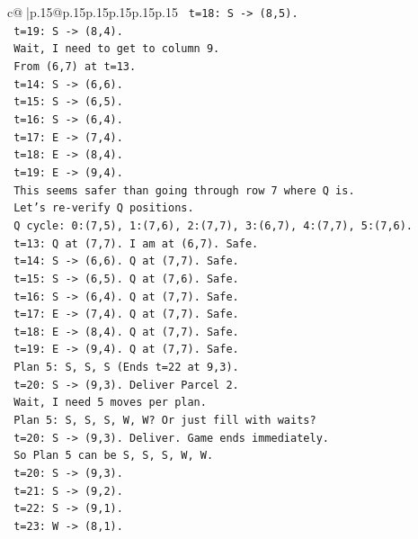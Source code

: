 \documentclass{article}
\begin{document}
{\begin{supertabular}{c@{$\;$}|p{.15\linewidth}@{}p{.15\linewidth}p{.15\linewidth}p{.15\linewidth}p{.15\linewidth}p{.15\linewidth}}
{{{\texttt{     t=18: S {-}> (8,5).} \\
\texttt{     t=19: S {-}> (8,4).} \\
\texttt{     Wait, I need to get to column 9.} \\
\texttt{     From (6,7) at t=13.} \\
\texttt{     t=14: S {-}> (6,6).} \\
\texttt{     t=15: S {-}> (6,5).} \\
\texttt{     t=16: S {-}> (6,4).} \\
\texttt{     t=17: E {-}> (7,4).} \\
\texttt{     t=18: E {-}> (8,4).} \\
\texttt{     t=19: E {-}> (9,4).} \\
\texttt{     This seems safer than going through row 7 where Q is.} \\
\texttt{     Let's re{-}verify Q positions.} \\
\texttt{     Q cycle: 0:(7,5), 1:(7,6), 2:(7,7), 3:(6,7), 4:(7,7), 5:(7,6).} \\
\texttt{     t=13: Q at (7,7). I am at (6,7). Safe.} \\
\texttt{     t=14: S {-}> (6,6). Q at (7,7). Safe.} \\
\texttt{     t=15: S {-}> (6,5). Q at (7,6). Safe.} \\
\texttt{     t=16: S {-}> (6,4). Q at (7,7). Safe.} \\
\texttt{     t=17: E {-}> (7,4). Q at (7,7). Safe.} \\
\texttt{     t=18: E {-}> (8,4). Q at (7,7). Safe.} \\
\texttt{     t=19: E {-}> (9,4). Q at (7,7). Safe.} \\
\texttt{   Plan 5: S, S, S (Ends t=22 at 9,3).} \\
\texttt{     t=20: S {-}> (9,3). Deliver Parcel 2.} \\
\texttt{     Wait, I need 5 moves per plan.} \\
\texttt{     Plan 5: S, S, S, W, W? Or just fill with waits?} \\
\texttt{     t=20: S {-}> (9,3). Deliver. Game ends immediately.} \\
\texttt{     So Plan 5 can be S, S, S, W, W.} \\
\texttt{     t=20: S {-}> (9,3).} \\
\texttt{     t=21: S {-}> (9,2).} \\
\texttt{     t=22: S {-}> (9,1).} \\
\texttt{     t=23: W {-}> (8,1).} \\
}}}
\end{supertabular}}
\end{document}

